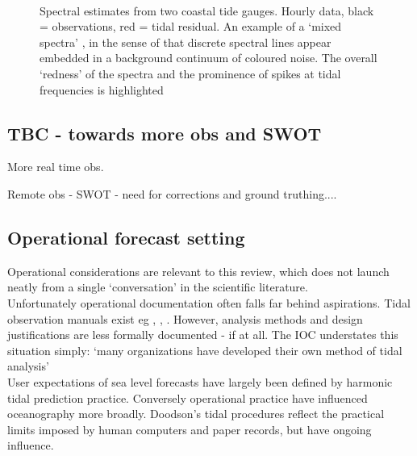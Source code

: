 \begin{figure}[h]\centering
	 \\
	\caption{Spectral estimates from two coastal tide gauges. Hourly data, black = observations, red = tidal residual. An example of a `mixed spectra' \citep{Percival:1998tw}, in the sense of that discrete spectral lines appear embedded in a background continuum of coloured noise.  The overall `redness' of the spectra and the prominence of spikes at tidal frequencies is highlighted }
    \label{fig:SPECTRA_EG}
\end{figure}


\subsection{TBC - towards more obs and SWOT}

More real time obs.

Remote obs - SWOT - need for corrections and ground truthing....


\subsection{Operational forecast setting}
\label{S:operational_setting}

Operational considerations are relevant to this review, which does not launch neatly from a single `conversation' \citep{Booth:2009vy} in the scientific literature.\\
Unfortunately operational documentation often falls far behind aspirations.
Tidal observation manuals exist eg \citep{IOC:2005tj}, \citep{Level:2011wu}, \citep{Parker:2007wq}.  However, analysis methods and design justifications are less formally documented - if at all.  The IOC understates this situation simply: `many organizations have developed their own method of tidal analysis'\citep{IOC:2005tj}\\

User expectations of sea level forecasts have largely been defined by harmonic tidal prediction practice. 
Conversely operational practice have influenced oceanography more broadly. Doodson's \citep{Doodson:1928wf} tidal procedures reflect the practical limits imposed by human computers and paper records, but have ongoing influence. \\



